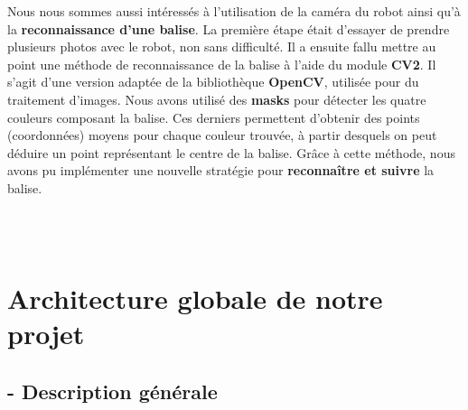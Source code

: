 \documentclass[12pt]{article}
\begin{document}
\hspace{\parindent}Nous nous sommes aussi intéressés à l'utilisation de la caméra du robot ainsi qu'à la \textbf{reconnaissance d'une balise}. La première étape était d'essayer de prendre plusieurs photos avec le robot, non sans difficulté. Il a ensuite fallu mettre au point une méthode de reconnaissance de la balise à l'aide du module \textbf{CV2}. Il s'agit d'une version adaptée de la bibliothèque \textbf{OpenCV}, utilisée pour du traitement d'images. Nous avons utilisé des \textbf{masks} pour détecter les quatre couleurs composant la balise. Ces derniers permettent d'obtenir des points (coordonnées) moyens pour chaque couleur trouvée, à partir desquels on peut déduire un point représentant le centre de la balise. Grâce à cette méthode, nous avons pu implémenter une nouvelle stratégie pour \textbf{reconnaître et suivre} la balise.


\\
\clearpage
\\
\section*{Architecture globale de notre projet}

\subsection*{- Description générale}

\end{document}

